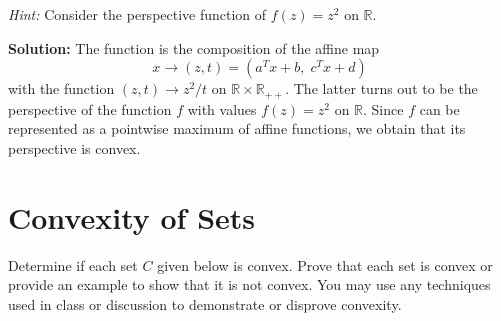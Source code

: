 \documentclass[10pt]{article}
\theoremstyle{definition}
\theoremstyle{plain}
\newcommand{\RR}{\mathbb{R}}
\begin{document}
\begin{enumerate}[label=(\alph*)]
    \emph{Hint:} Consider the perspective function of $f(z) = z^2$ on $\RR$.

    \textbf{Solution:} The function is the composition of the affine map
    \[
        x \to (z, t) = (a^T x + b, \; c^T x + d)
    \]
    with the function $(z, t) \to z^2/t$ on $\RR \times \RR_{++}$. The latter turns out to be the perspective of the function $f$ with values $f(z) = z^2$ on $\RR$. Since $f$ can be represented as a pointwise maximum of affine functions, we obtain that its perspective is convex.
\end{enumerate}

\section{Convexity of Sets}

Determine if each set $C$ given below is convex. Prove that each set is convex or provide an example to show that it is not convex. You may use any techniques used in class or discussion to demonstrate or disprove convexity.
\end{document}
